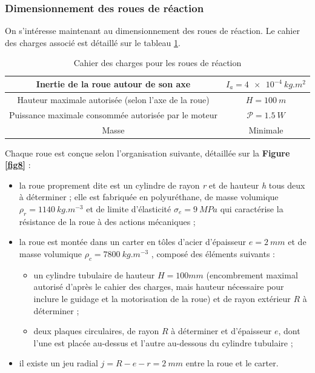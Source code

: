 %
%
%


\subsubsection{Dimensionnement des roues de réaction}
\ifprof
\else

On s'intéresse maintenant au dimensionnement des roues de réaction. Le
cahier des charges associé est détaillé sur le tableau \ref{tab7}.

\begin{table}[!htb]
\begin{center}
\begin{tabular}{|c|c|}
\hline
Inertie de la roue autour de son axe &$I_a=\SI{4e-4}{kg.m^{2}}$\\ \hline
Hauteur maximale autorisée (selon l'axe de la roue) & $H=\SI{100}{m}$\\ \hline
Puissance maximale consommée autorisée par le moteur & $\mathcal{P}=\SI{1,5}{W}$\\ \hline
Masse & Minimale\\ \hline
\end{tabular}
\caption{Cahier des charges pour les roues de réaction \label{tab7}}
\end{center}
\end{table}



Chaque roue est conçue selon l'organisation suivante, détaillée sur la
\textbf{Figure \ref{fig8}} :

\begin{itemize}
\item  la roue proprement dite est un cylindre de rayon \emph{r} et de
  hauteur \emph{h} tous deux à déterminer ; elle est fabriquée en
  polyuréthane, de masse volumique $\rho_r=\SI{1140}{kg.m^{-3}}$ et de limite d'élasticité $\sigma_e=\SI{9}{MPa}$ qui caractérise la résistance de la roue à des actions mécaniques ;
\item   la roue est montée dans un carter en tôles d'acier d'épaisseur
 $e = \SI{2}{mm}$ et de masse volumique $\rho_c=\SI{7800}{kg.m^{-3}}$ , composé des éléments suivants :
  \begin{itemize}
  \item     un cylindre tubulaire de hauteur $H = 100 mm$ (encombrement
    maximal autorisé d'après le cahier des charges, mais hauteur
    nécessaire pour inclure le guidage et la motorisation de la roue) et
    de rayon extérieur $R$ à déterminer ;
  \item 
    deux plaques circulaires, de rayon $R$ à déterminer et
    d'épaisseur $e$, dont l'une est placée au-dessus et l'autre
    au-dessous du cylindre tubulaire ;
  \end{itemize}
\item  il existe un jeu radial $j=R-e-r=\SI{2}{mm}$ entre la roue et le carter.
\end{itemize}


